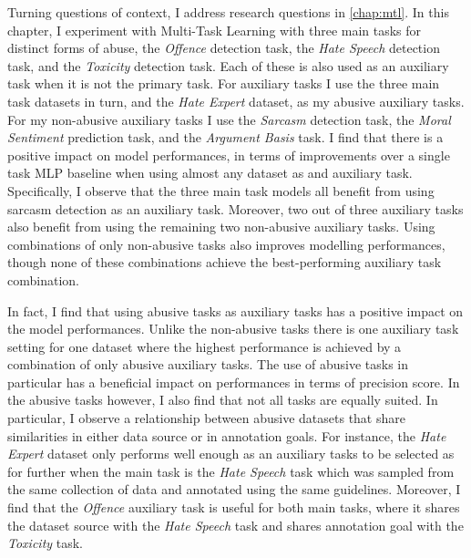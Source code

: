 Turning questions of context, I address research questions  in \cref{chap:mtl}.
In this chapter, I experiment with Multi-Task Learning with three main tasks for distinct forms of abuse, the \textit{Offence} detection task, the \textit{Hate Speech} detection task, and the \textit{Toxicity} detection task.
Each of these is also used as an auxiliary task when it is not the primary task.
For auxiliary tasks I use the three main task datasets in turn, and the \textit{Hate Expert} dataset, as my abusive auxiliary tasks.
For my non-abusive auxiliary tasks I use the \textit{Sarcasm} detection task, the \textit{Moral Sentiment} prediction task, and the \textit{Argument Basis} task.
 I find that there is a positive impact on model performances, in terms of improvements over a single task MLP baseline when using almost any dataset as and auxiliary task.
Specifically, I observe that the three main task models  all benefit from using sarcasm detection as an auxiliary task.
Moreover, two out of three auxiliary tasks also benefit from using the remaining two non-abusive auxiliary tasks.
Using combinations of only non-abusive tasks also improves modelling performances, though none of these combinations achieve the best-performing auxiliary task combination.

In fact, I find that using abusive tasks as auxiliary tasks has a positive impact on the model performances.
Unlike the non-abusive tasks there is one auxiliary task setting for one dataset where the highest performance is achieved by a combination of only abusive auxiliary tasks.
The use of abusive tasks in particular has a beneficial impact on performances in terms of precision score.
In the abusive tasks however, I also find that not all tasks are equally suited.
In particular, I observe a relationship between abusive datasets that share similarities in either data source or in annotation goals.
For instance, the \textit{Hate Expert} dataset only performs well enough as an auxiliary tasks to be selected as for further when the main task is the \textit{Hate Speech} task which was sampled from the same collection of data and annotated using the same guidelines.
Moreover, I find that the \textit{Offence} auxiliary task is useful for both main tasks, where it shares the dataset source with the \textit{Hate Speech} task and shares annotation goal with the \textit{Toxicity} task.

